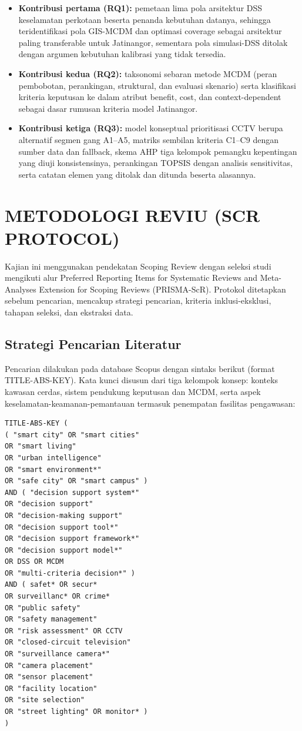 \documentclass[conference]{IEEEtran}
\begin{document}
\begin{itemize}
\item \textbf{Kontribusi pertama (RQ1):} pemetaan lima pola arsitektur DSS keselamatan perkotaan beserta penanda kebutuhan datanya, sehingga teridentifikasi pola GIS-MCDM dan optimasi coverage sebagai arsitektur paling transferable untuk Jatinangor, sementara pola simulasi-DSS ditolak dengan argumen kebutuhan kalibrasi yang tidak tersedia.
\item \textbf{Kontribusi kedua (RQ2):} taksonomi sebaran metode MCDM (peran pembobotan, perankingan, struktural, dan evaluasi skenario) serta klasifikasi kriteria keputusan ke dalam atribut benefit, cost, dan context-dependent sebagai dasar rumusan kriteria model Jatinangor.
\item \textbf{Kontribusi ketiga (RQ3):} model konseptual prioritisasi CCTV berupa alternatif segmen gang A1--A5, matriks sembilan kriteria C1--C9 dengan sumber data dan fallback, skema AHP tiga kelompok pemangku kepentingan yang diuji konsistensinya, perankingan TOPSIS dengan analisis sensitivitas, serta catatan elemen yang ditolak dan ditunda beserta alasannya.
\end{itemize}

\section{METODOLOGI REVIU (SCR PROTOCOL)}

Kajian ini menggunakan pendekatan Scoping Review dengan seleksi studi mengikuti alur Preferred Reporting Items for Systematic Reviews and Meta-Analyses Extension for Scoping Reviews (PRISMA-ScR). Protokol ditetapkan sebelum pencarian, mencakup strategi pencarian, kriteria inklusi-eksklusi, tahapan seleksi, dan ekstraksi data.

\subsection{Strategi Pencarian Literatur}

Pencarian dilakukan pada database Scopus dengan sintaks berikut (format TITLE-ABS-KEY). Kata kunci disusun dari tiga kelompok konsep: konteks kawasan cerdas, sistem pendukung keputusan dan MCDM, serta aspek keselamatan-keamanan-pemantauan termasuk penempatan fasilitas pengawasan:

{\footnotesize
\begin{verbatim}
TITLE-ABS-KEY (
( "smart city" OR "smart cities"
OR "smart living"
OR "urban intelligence"
OR "smart environment*"
OR "safe city" OR "smart campus" )
AND ( "decision support system*"
OR "decision support"
OR "decision-making support"
OR "decision support tool*"
OR "decision support framework*"
OR "decision support model*"
OR DSS OR MCDM
OR "multi-criteria decision*" )
AND ( safet* OR secur*
OR surveillanc* OR crime*
OR "public safety"
OR "safety management"
OR "risk assessment" OR CCTV
OR "closed-circuit television"
OR "surveillance camera*"
OR "camera placement"
OR "sensor placement"
OR "facility location"
OR "site selection"
OR "street lighting" OR monitor* )
)
\end{verbatim}
}
\end{document}
